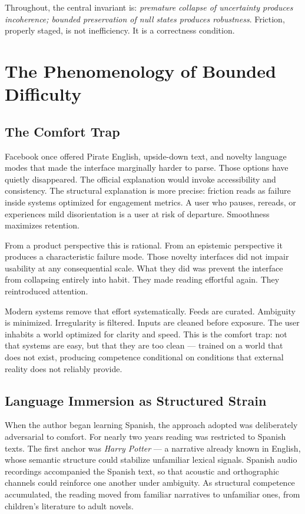 \documentclass[11pt]{article}
\theoremstyle{remark}
\begin{document}
Throughout, the central invariant is: \emph{premature collapse of uncertainty produces incoherence; bounded preservation of null states produces robustness}. Friction, properly staged, is not inefficiency. It is a correctness condition.

\section{The Phenomenology of Bounded Difficulty}
\label{sec:phenomenology}

\subsection{The Comfort Trap}

Facebook once offered Pirate English, upside-down text, and novelty language modes that made the interface marginally harder to parse. Those options have quietly disappeared. The official explanation would invoke accessibility and consistency. The structural explanation is more precise: friction reads as failure inside systems optimized for engagement metrics. A user who pauses, rereads, or experiences mild disorientation is a user at risk of departure. Smoothness maximizes retention.

From a product perspective this is rational. From an epistemic perspective it produces a characteristic failure mode. Those novelty interfaces did not impair usability at any consequential scale. What they did was prevent the interface from collapsing entirely into habit. They made reading effortful again. They reintroduced attention.

Modern systems remove that effort systematically. Feeds are curated. Ambiguity is minimized. Irregularity is filtered. Inputs are cleaned before exposure. The user inhabits a world optimized for clarity and speed. This is the comfort trap: not that systems are easy, but that they are too clean --- trained on a world that does not exist, producing competence conditional on conditions that external reality does not reliably provide.

\subsection{Language Immersion as Structured Strain}

When the author began learning Spanish, the approach adopted was deliberately adversarial to comfort. For nearly two years reading was restricted to Spanish texts. The first anchor was \emph{Harry Potter} --- a narrative already known in English, whose semantic structure could stabilize unfamiliar lexical signals. Spanish audio recordings accompanied the Spanish text, so that acoustic and orthographic channels could reinforce one another under ambiguity. As structural competence accumulated, the reading moved from familiar narratives to unfamiliar ones, from children's literature to adult novels.
\end{document}
